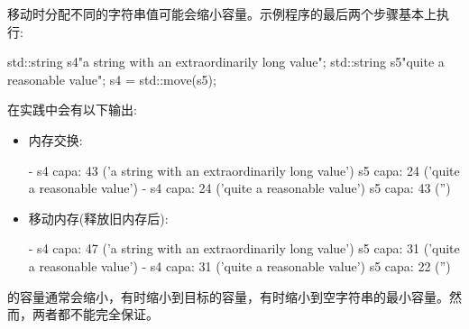 移动时分配不同的字符串值可能会缩小容量。示例程序的最后两个步骤基本上执行:

\begin{cppcode}
std::string s4{"a string with an extraordinarily long value"};
std::string s5{"quite a reasonable value"};
s4 = std::move(s5);
\end{cppcode}

在实践中会有以下输出:

\begin{itemize}
	\item 内存交换:
	\begin{outputcode}
- s4 capa: 43 ('a string with an extraordinarily long value')
s5 capa: 24 ('quite a reasonable value')
- s4 capa: 24 ('quite a reasonable value')
s5 capa: 43 ('')
	\end{outputcode}
	\item 移动内存(释放旧内存后):
	\begin{outputcode}
- s4 capa: 47 ('a string with an extraordinarily long value')
s5 capa: 31 ('quite a reasonable value')
- s4 capa: 31 ('quite a reasonable value')
s5 capa: 22 ('')
	\end{outputcode}
\end{itemize}

的容量通常会缩小，有时缩小到目标的容量，有时缩小到空字符串的最小容量。然而，两者都不能完全保证。
